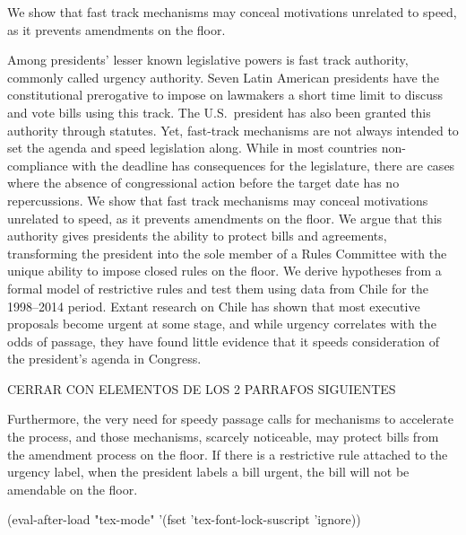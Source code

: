 We show that fast track mechanisms may conceal motivations unrelated to speed, as it prevents amendments on the floor.


\noindent  Among presidents' lesser known legislative powers is fast track authority, commonly called urgency authority. Seven Latin American presidents have the constitutional prerogative to impose on lawmakers a short time limit to discuss and vote bills using this track. The U.S.\ president has also been granted this authority through statutes. Yet, fast-track mechanisms are not always intended to set the agenda and speed legislation along. While in most countries non-compliance with the deadline has consequences for the legislature, there are cases where the absence of congressional action before the target date has no repercussions. We show that fast track mechanisms may conceal motivations unrelated to speed, as it prevents amendments on the floor. We argue that this authority gives presidents the ability to protect bills and agreements, transforming the president into the sole member of a Rules Committee with the unique ability to impose closed rules on the floor.  We derive hypotheses from a formal model of restrictive rules and test them using data from Chile for the 1998--2014 period. Extant research on Chile has shown that most executive proposals become urgent at some stage, and while urgency correlates with the odds of passage, they have found little evidence that it speeds consideration of the president's agenda in Congress.



CERRAR CON ELEMENTOS DE LOS 2 PARRAFOS SIGUIENTES


Furthermore, the very need for speedy passage calls for mechanisms to accelerate the process, and those mechanisms, scarcely noticeable, may protect bills from the amendment process on the floor. If there is a restrictive rule attached to the urgency label, when the president labels a bill urgent, the bill will not be amendable on the floor.




(eval-after-load "tex-mode" '(fset 'tex-font-lock-suscript 'ignore))

